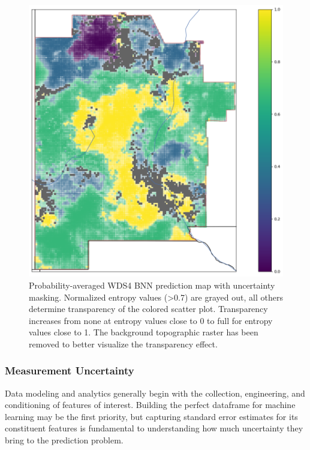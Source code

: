 \begin{figure}[!htp]
\centering
\includegraphics[width=.8\textwidth]{templates/images/Figure-BNN_All_Gradient_Map_Masked_whitebackground.png}
\caption[Parameter uncertainty mask on BNN prediction map]
{Probability-averaged WDS4 BNN prediction map with uncertainty masking. Normalized entropy values (>0.7) are grayed out, all others determine transparency of the colored scatter plot. Transparency increases from none at entropy values close to 0 to full for entropy values close to 1. The background topographic raster has been removed to better visualize the transparency effect.}
\label{fig:bnn_masked_pred_map}
\end{figure}

\subsubsection{Measurement Uncertainty}
\label{ch5:measure_uncertainty}

Data modeling and analytics generally begin with the collection, engineering, and conditioning of features of interest. Building the perfect dataframe for machine learning may be the first priority, but capturing standard error estimates for its constituent features is fundamental to understanding how much uncertainty they bring to the prediction problem.


